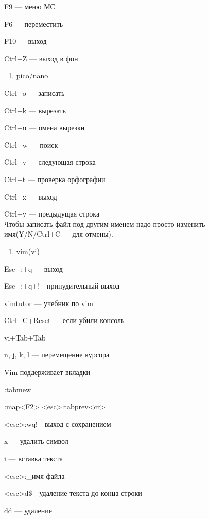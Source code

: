 \par 
F9 — меню МС
\par 
F6 — переместить 

\par 
F10 — выход 

\par 
Ctrl+Z — выход в фон

\begin{enumerate}
	\item \par 
	pico/nano
\end{enumerate}
\par 
Ctrl+o — записать 

\par 
Ctrl+k — вырезать 

\par 
Ctrl+u — омена вырезки
\par 
Ctrl+w — поиск 

\par 
Ctrl+v — следующая строка
\par 
Ctrl+t — проверка орфографии
\par 
Ctrl+x — выход  

\par 
Ctrl+y — предыдущая строка\\Чтобы записать
файл под другим именем надо просто
изменить имя(Y/N/Ctrl+C — для отмены).
\begin{enumerate}
	\item \par 
	vim(vi)
\end{enumerate}
\par 
Esc+:+q — выход 

\par 
Esc+:+q+! - принудительный выход 

\par 
vimtutor — учебник по vim
\par 
Ctrl+C+Reset — если убили консоль
\par 
vi+Tab+Tab
\par 
n, j, k, l — перемещение курсора
\par 
Vim поддерживает вкладки
\par 
:tabmew
\par 
:map<F2> <esc>:tabprev<cr>
\par 
<esc>:wq! - выход с сохранением
\par 
x — удалить символ
\par 
i — вставка текста
\par 
<esc>:\_имя файла
\par 
<esc>d\$ - удаление текста до конца строки
\par 
dd — удаление

